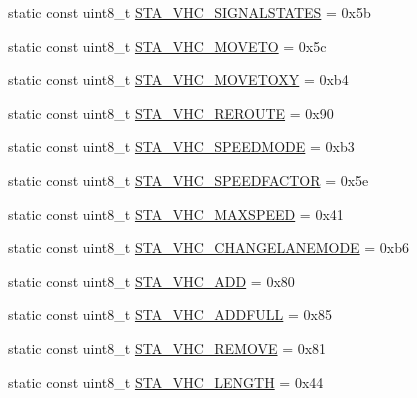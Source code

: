 \begin{DoxyCompactItemize}
\item 
static const uint8\+\_\+t \hyperlink{classtraci__api_1_1_vehicle_manager_a56909b0447f4c2edad044a4579334938}{S\+T\+A\+\_\+\+V\+H\+C\+\_\+\+S\+I\+G\+N\+A\+L\+S\+T\+A\+T\+ES} = 0x5b
\item 
static const uint8\+\_\+t \hyperlink{classtraci__api_1_1_vehicle_manager_a1bd791cd7190fa808b2b45dc2eaa8929}{S\+T\+A\+\_\+\+V\+H\+C\+\_\+\+M\+O\+V\+E\+TO} = 0x5c
\item 
static const uint8\+\_\+t \hyperlink{classtraci__api_1_1_vehicle_manager_afcb459d52da83576184bd006880ca157}{S\+T\+A\+\_\+\+V\+H\+C\+\_\+\+M\+O\+V\+E\+T\+O\+XY} = 0xb4
\item 
static const uint8\+\_\+t \hyperlink{classtraci__api_1_1_vehicle_manager_a066983f2b530670d111eb84e69beacd1}{S\+T\+A\+\_\+\+V\+H\+C\+\_\+\+R\+E\+R\+O\+U\+TE} = 0x90
\item 
static const uint8\+\_\+t \hyperlink{classtraci__api_1_1_vehicle_manager_a342b4b6d80950b22f1b74fd8e020395d}{S\+T\+A\+\_\+\+V\+H\+C\+\_\+\+S\+P\+E\+E\+D\+M\+O\+DE} = 0xb3
\item 
static const uint8\+\_\+t \hyperlink{classtraci__api_1_1_vehicle_manager_ab75abfc45f99aa7a031d5f4c8701c76c}{S\+T\+A\+\_\+\+V\+H\+C\+\_\+\+S\+P\+E\+E\+D\+F\+A\+C\+T\+OR} = 0x5e
\item 
static const uint8\+\_\+t \hyperlink{classtraci__api_1_1_vehicle_manager_a60e5548ae4ee814e33d6e7ec9581b6e3}{S\+T\+A\+\_\+\+V\+H\+C\+\_\+\+M\+A\+X\+S\+P\+E\+ED} = 0x41
\item 
static const uint8\+\_\+t \hyperlink{classtraci__api_1_1_vehicle_manager_a3c4d5d091512c5689442bed9dab017b0}{S\+T\+A\+\_\+\+V\+H\+C\+\_\+\+C\+H\+A\+N\+G\+E\+L\+A\+N\+E\+M\+O\+DE} = 0xb6
\item 
static const uint8\+\_\+t \hyperlink{classtraci__api_1_1_vehicle_manager_ae8241e67583df78a7937b1741a6533d1}{S\+T\+A\+\_\+\+V\+H\+C\+\_\+\+A\+DD} = 0x80
\item 
static const uint8\+\_\+t \hyperlink{classtraci__api_1_1_vehicle_manager_a650514c7298bd7ceb011aba2cd3318c8}{S\+T\+A\+\_\+\+V\+H\+C\+\_\+\+A\+D\+D\+F\+U\+LL} = 0x85
\item 
static const uint8\+\_\+t \hyperlink{classtraci__api_1_1_vehicle_manager_a8a3a1bbcd9217c289bb9e47a2aee838c}{S\+T\+A\+\_\+\+V\+H\+C\+\_\+\+R\+E\+M\+O\+VE} = 0x81
\item 
static const uint8\+\_\+t \hyperlink{classtraci__api_1_1_vehicle_manager_a9c1ca67d52057f033c38014b8e5adc8e}{S\+T\+A\+\_\+\+V\+H\+C\+\_\+\+L\+E\+N\+G\+TH} = 0x44
\item 

\end{DoxyCompactItemize}

